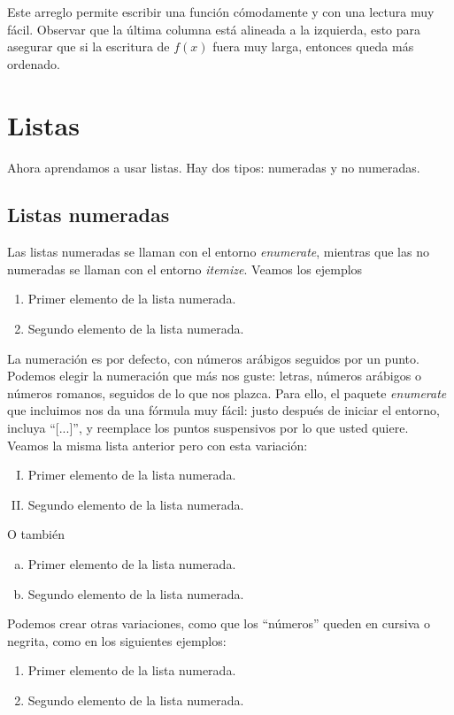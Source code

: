 \documentclass{article}
\begin{document}
Este arreglo permite escribir una función cómodamente y con una lectura muy fácil. Observar que la última columna está alineada a la izquierda, esto para asegurar que si la escritura de $f(x)$ fuera muy larga, entonces queda más ordenado.

\section*{Listas}
Ahora aprendamos a usar listas. Hay dos tipos: numeradas y no numeradas. 

\subsection*{Listas numeradas}
Las listas numeradas se llaman con el entorno \textit{enumerate}, mientras que las no numeradas se llaman con el entorno \textit{itemize}. Veamos los ejemplos
	\begin{enumerate}
		\item Primer elemento de la lista numerada.
		\item Segundo elemento de la lista numerada.		
	\end{enumerate}

La numeración es por defecto, con números arábigos seguidos por un punto. Podemos elegir la numeración que más nos guste: letras, números arábigos o números romanos, seguidos de lo que nos plazca. Para ello, el paquete \textit{enumerate} que incluimos nos da una fórmula muy fácil: justo después de iniciar el entorno, incluya ``[...]'', y reemplace los puntos suspensivos por lo que usted quiere. Veamos la misma lista anterior pero con esta variación:
	\begin{enumerate}[I)]
		\item Primer elemento de la lista numerada.
		\item Segundo elemento de la lista numerada.		
	\end{enumerate}

O también
	\begin{enumerate}[a)]
		\item Primer elemento de la lista numerada.
		\item Segundo elemento de la lista numerada.		
	\end{enumerate}

Podemos crear otras variaciones, como que los ``números'' queden en cursiva o negrita, como en los siguientes ejemplos:
	\begin{enumerate}[\it a)]
		\item Primer elemento de la lista numerada.
		\item Segundo elemento de la lista numerada.		
	\end{enumerate}
\end{document}
